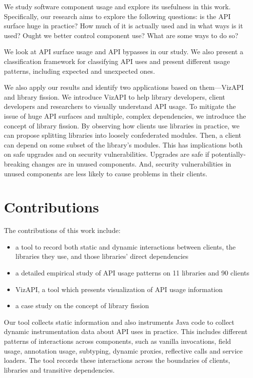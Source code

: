 We study software component usage and explore its usefulness in this work. Specifically, our research aims to explore the following questions: is the API surface huge in practice? How much of it is actually used and in what ways is it used? Ought we better control component use? What are some ways to do so? 

We look at API surface usage and API bypasses in our study. We also present a classification framework for classifying API uses and present different usage patterns, including expected and unexpected ones. 

We also apply our results and identify two applications based on them---VizAPI and library fission. We introduce VizAPI to help library developers, client developers and researchers to visually understand API usage. To mitigate the issue of huge API surfaces and multiple, complex dependencies, we introduce the concept of library fission. By observing how clients use libraries in practice, we can propose splitting libraries into loosely confederated modules. Then, a client can depend on some subset of the library’s modules. This has implications both on safe upgrades and on security vulnerabilities. Upgrades are
 safe if potentially-breaking changes are in unused components. And, security vulnerabilities in unused components are less likely to cause problems in their clients.

\section{Contributions}
\label{sec:contributions}

The contributions of this work include:
\begin{itemize}
\item a tool to record both static and dynamic interactions between clients, the libraries they use, and those libraries’ direct dependencies
\item a detailed empirical study of API usage patterns on 11 libraries and 90 clients 
\item VizAPI, a tool which presents visualization of API usage information
\item a case study on the concept of library fission
\end{itemize}

Our tool collects static information and also instruments Java code to collect dynamic instrumentation data about API uses in practice. This includes different patterns of interactions across components, such as vanilla invocations, field usage, annotation usage, subtyping, dynamic proxies, reflective calls and service loaders. The tool records these interactions across the boundaries of clients, libraries and transitive dependencies.

